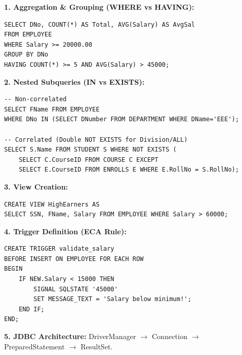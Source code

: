 \documentclass[10pt,a4paper]{article}
\newcommand{\ic}[1]{\mbox{\colorbox{AnthCodeBG}{\footnotesize\ttfamily\textcolor{AnthBlue}{#1}}}}
\begin{document}
\begin{tcolorbox}[formulabox, title=Must-Know SQL Constructs]
\scriptsize
\begin{minipage}[t]{0.48\textwidth}
\textbf{1. Aggregation \& Grouping (WHERE vs HAVING):}
\begin{lstlisting}
SELECT DNo, COUNT(*) AS Total, AVG(Salary) AS AvgSal
FROM EMPLOYEE
WHERE Salary >= 20000.00
GROUP BY DNo
HAVING COUNT(*) >= 5 AND AVG(Salary) > 45000;
\end{lstlisting}
\textbf{2. Nested Subqueries (IN vs EXISTS):}
\begin{lstlisting}
-- Non-correlated
SELECT FName FROM EMPLOYEE 
WHERE DNo IN (SELECT DNumber FROM DEPARTMENT WHERE DName='EEE');

-- Correlated (Double NOT EXISTS for Division/ALL)
SELECT S.Name FROM STUDENT S WHERE NOT EXISTS (
    SELECT C.CourseID FROM COURSE C EXCEPT 
    SELECT E.CourseID FROM ENROLLS E WHERE E.RollNo = S.RollNo);
\end{lstlisting}
\end{minipage}\hfill
\begin{minipage}[t]{0.48\textwidth}
\textbf{3. View Creation:}
\begin{lstlisting}
CREATE VIEW HighEarners AS 
SELECT SSN, FName, Salary FROM EMPLOYEE WHERE Salary > 60000;
\end{lstlisting}
\textbf{4. Trigger Definition (ECA Rule):}
\begin{lstlisting}
CREATE TRIGGER validate_salary 
BEFORE INSERT ON EMPLOYEE FOR EACH ROW 
BEGIN 
    IF NEW.Salary < 15000 THEN 
        SIGNAL SQLSTATE '45000' 
        SET MESSAGE_TEXT = 'Salary below minimum!';
    END IF; 
END;
\end{lstlisting}
\textbf{5. JDBC Architecture:} \ic{DriverManager} $\to$ \ic{Connection} $\to$ \ic{PreparedStatement} $\to$ \ic{ResultSet}.
\end{minipage}
\end{tcolorbox}
\end{document}
